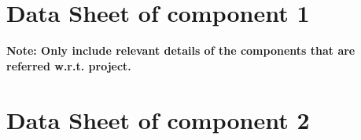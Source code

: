 \begin{appendices}
\chapter{Data Sheet of component 1 }

{\large \textbf{Note: Only include relevant details of the components that are referred w.r.t. project.}}


\chapter{Data Sheet of component 2}
\setcounter{page}{20}


 
\end{appendices}

